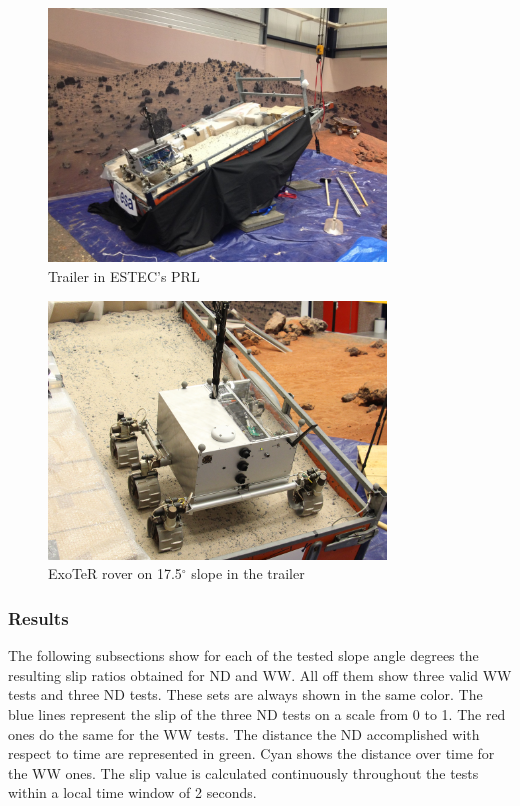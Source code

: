 \documentclass[a4paper,twocolumn]{esapub2005} %
\begin{document}
\begin{figure}[b!]
    \centering
    \includegraphics[width=0.8\textwidth]{trailersetup.jpg}
    \caption{Trailer in ESTEC's PRL}
    \label{fig:trailer}
\end{figure}

\begin{figure}[t!]
    \centering
    \includegraphics[width=0.8\textwidth]{Exoslope.jpg}
    \caption{ExoTeR rover on 17.5$^{\circ}$ slope in the trailer}
    \label{fig:Exoslope}
\end{figure}

\subsubsection{Results} 
The following subsections show for each of the tested slope angle degrees the
resulting slip ratios obtained for ND and WW. All off them show three valid WW
tests and three ND tests. These sets are always shown in the same color. The
blue lines represent the slip of the three ND tests on a scale from 0 to 1. The
red ones do the same for the WW tests. The distance the ND accomplished with
respect to time are represented in green. Cyan shows the distance over time for
the WW ones. The slip value is calculated continuously throughout the tests
within a local time window of 2 seconds.
\end{document}
